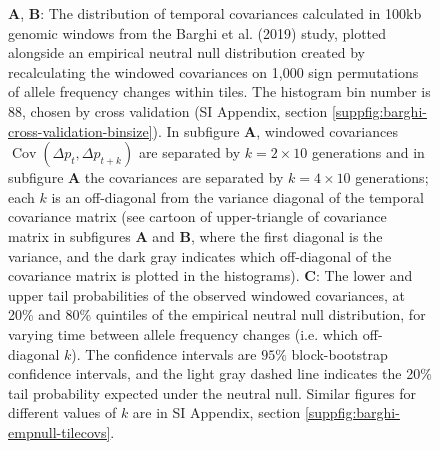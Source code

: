 \documentclass[9pt,twocolumn,twoside]{pnas-new}
\DeclareMathOperator{\cov}{Cov}
\begin{document}
\begin{figure}
  \caption{\footnotesize {\bf A}, {\bf B}: The distribution of temporal
    covariances calculated in 100kb genomic windows from the
    Barghi et al. (2019) study, plotted alongside an empirical neutral null
    distribution created by recalculating the windowed covariances on 1,000
    sign permutations of allele frequency changes within tiles. The histogram
    bin number is 88, chosen by cross validation (SI Appendix, section
    \ref{suppfig:barghi-cross-validation-binsize}). In subfigure {\bf A},
    windowed covariances $\cov(\Delta p_t, \Delta p_{t+k})$ are separated by
    $k=2 \times 10$ generations and in subfigure {\bf A} the covariances are
    separated by $k=4 \times 10$ generations; each $k$ is an off-diagonal from
    the variance diagonal of the temporal covariance matrix (see cartoon of
    upper-triangle of covariance matrix in subfigures {\bf A} and {\bf B},
    where the first diagonal is the variance, and the dark gray indicates which
    off-diagonal of the covariance matrix is plotted in the histograms). {\bf
    C}: The lower and upper tail probabilities of the observed windowed
    covariances, at 20\% and 80\% quintiles of the empirical neutral null
    distribution, for varying time between allele frequency changes (i.e. which
    off-diagonal $k$). The confidence intervals are  $95\%$ block-bootstrap
  confidence intervals, and the light gray dashed line indicates the 20\% tail
probability expected under the neutral null. Similar figures for different
values of $k$ are in SI Appendix, section
\ref{suppfig:barghi-empnull-tilecovs}. }

    \label{fig:figure-3} 
\end{figure}
\end{document}
